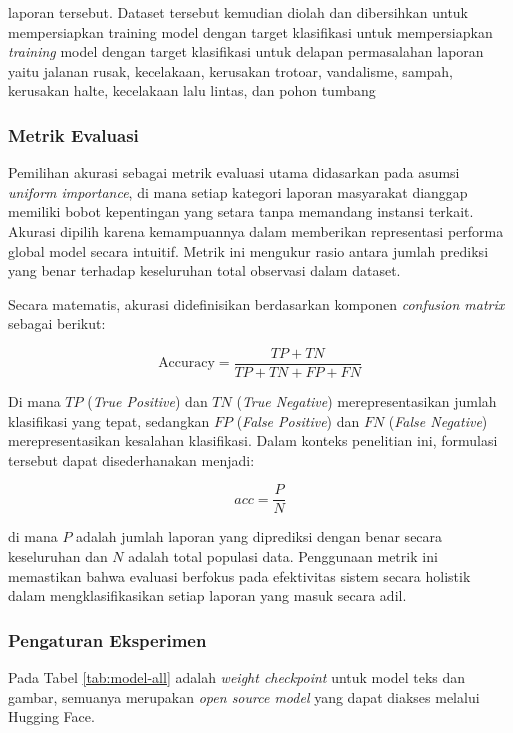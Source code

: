 laporan tersebut.
Dataset tersebut kemudian diolah dan dibersihkan untuk
mempersiapkan training model dengan target klasifikasi untuk mempersiapkan \textit{training} model dengan target klasifikasi untuk delapan permasalahan laporan yaitu jalanan rusak, kecelakaan, kerusakan trotoar, vandalisme, sampah, kerusakan halte, kecelakaan lalu lintas, dan pohon tumbang

\subsubsection{Metrik Evaluasi}

Pemilihan akurasi sebagai metrik evaluasi utama didasarkan pada asumsi \textit{uniform importance}, di mana setiap kategori laporan masyarakat dianggap memiliki bobot kepentingan yang setara tanpa memandang instansi terkait. Akurasi dipilih karena kemampuannya dalam memberikan representasi performa global model secara intuitif. Metrik ini mengukur rasio antara jumlah prediksi yang benar terhadap keseluruhan total observasi dalam dataset.

Secara matematis, akurasi didefinisikan berdasarkan komponen \textit{confusion matrix} sebagai berikut:

\begin{equation}
    \label{eq:accuracy_full}
    \text{Accuracy} = \frac{TP + TN}{TP + TN + FP + FN}
\end{equation}

Di mana $TP$ (\textit{True Positive}) dan $TN$ (\textit{True Negative}) merepresentasikan jumlah klasifikasi yang tepat, sedangkan $FP$ (\textit{False Positive}) dan $FN$ (\textit{False Negative}) merepresentasikan kesalahan klasifikasi. Dalam konteks penelitian ini, formulasi tersebut dapat disederhanakan menjadi:

\begin{equation}
    \label{eq:accuracy_simple}
    acc = \frac{P}{N}
\end{equation}

di mana $P$ adalah jumlah laporan yang diprediksi dengan benar secara keseluruhan dan $N$ adalah total populasi data. Penggunaan metrik ini memastikan bahwa evaluasi berfokus pada efektivitas sistem secara holistik dalam mengklasifikasikan setiap laporan yang masuk secara adil.

\subsubsection{Pengaturan Eksperimen}
Pada Tabel \ref{tab:model-all} adalah \textit{weight checkpoint} untuk model teks dan gambar, semuanya merupakan \textit{open source model} yang dapat diakses melalui Hugging Face.

